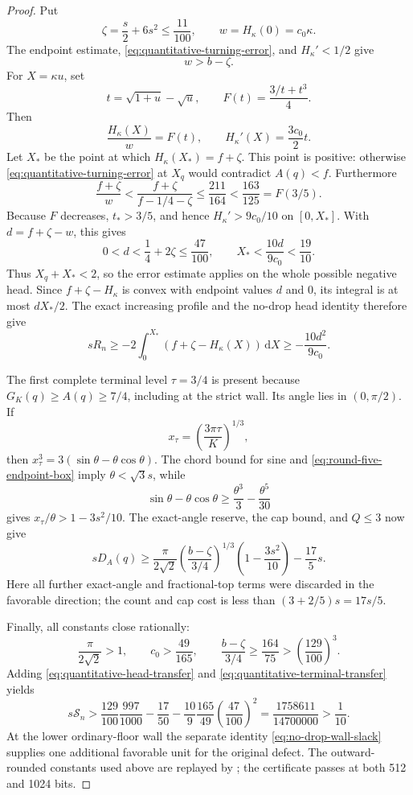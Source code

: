 \documentclass[11pt]{article}
\theoremstyle{remark}
\newcommand{\dd}{\,\mathrm d}
\begin{document}
\begin{proof}
Put
\[
 \zeta=\frac s2+6s^2\leq\frac{11}{100},
 \qquad w=H_\kappa(0)=c_0\kappa.
\]
The endpoint estimate, \eqref{eq:quantitative-turning-error}, and
$H_\kappa'<1/2$ give
\begin{equation}
 w>b-\zeta.
 \label{eq:round-five-w-lower}
\end{equation}
For $X=\kappa u$, set
\[
 t=\sqrt{1+u}-\sqrt u,\qquad
 F(t)=\frac{3/t+t^3}{4}.
\]
Then
\[
 \frac{H_\kappa(X)}w=F(t),
 \qquad H_\kappa'(X)=\frac{3c_0}{2}t.
\]
Let $X_*$ be the point at which $H_\kappa(X_*)=f+\zeta$.  This point is
positive: otherwise \eqref{eq:quantitative-turning-error} at $X_q$ would
contradict $A(q)<f$.  Furthermore
\[
 \frac{f+\zeta}{w}
 <\frac{f+\zeta}{f-1/4-\zeta}
 \leq\frac{211}{164}<\frac{163}{125}=F(3/5).
\]
Because $F$ decreases, $t_*>3/5$, and hence
$H_\kappa'>9c_0/10$ on $[0,X_*]$.  With
$d=f+\zeta-w$, this gives
\[
 0<d<\frac14+2\zeta\leq\frac{47}{100},
 \qquad X_*<\frac{10d}{9c_0}<\frac{19}{10}.
\]
Thus $X_q+X_*<2$, so the error estimate applies on the whole possible
negative head.  Since $f+\zeta-H_\kappa$ is convex with endpoint values
$d$ and $0$, its integral is at most $dX_*/2$.  The exact increasing
profile and the no-drop head identity therefore give
\begin{equation}
 sR_n\geq-2\int_0^{X_*}
 (f+\zeta-H_\kappa(X))\dd X
 \geq-\frac{10d^2}{9c_0}.
 \label{eq:quantitative-head-transfer}
\end{equation}

The first complete terminal level $\tau=3/4$ is present because
$G_K(q)\geq A(q)\geq7/4$, including at the strict wall.  Its angle lies in
$(0,\pi/2)$.  If
\[
 x_\tau=\left(\frac{3\pi\tau}{K}\right)^{1/3},
\]
then $x_\tau^3=3(\sin\theta-\theta\cos\theta)$.  The chord bound for sine
and \eqref{eq:round-five-endpoint-box} imply $\theta<\sqrt3s$, while
\[
 \sin\theta-\theta\cos\theta
 \geq\frac{\theta^3}{3}-\frac{\theta^5}{30}
\]
gives $x_\tau/\theta>1-3s^2/10$.  The exact-angle reserve, the cap bound,
and $Q\leq3$ now give
\begin{equation}
 sD_A(q)\geq
 \frac\pi{2\sqrt2}
 \left(\frac{b-\zeta}{3/4}\right)^{1/3}
 \left(1-\frac{3s^2}{10}\right)-\frac{17}{5}s.
 \label{eq:quantitative-terminal-transfer}
\end{equation}
Here all further exact-angle and fractional-top terms were discarded in
the favorable direction; the count and cap cost is less than
$(3+2/5)s=17s/5$.

Finally, all constants close rationally:
\[
 \frac\pi{2\sqrt2}>1,\qquad c_0>\frac{49}{165},
 \qquad
 \frac{b-\zeta}{3/4}\geq\frac{164}{75}
 >\left(\frac{129}{100}\right)^3.
\]
Adding \eqref{eq:quantitative-head-transfer} and
\eqref{eq:quantitative-terminal-transfer} yields
\[
 s\mathcal S_n>
 \frac{129}{100}\frac{997}{1000}-\frac{17}{50}
 -\frac{10}{9}\frac{165}{49}\left(\frac{47}{100}\right)^2
 =\frac{1758611}{14700000}>\frac1{10}.
\]
At the lower ordinary-floor wall the separate identity
\eqref{eq:no-drop-wall-slack} supplies one additional favorable unit for
the original defect.  The outward-rounded constants used above are replayed
by ; the certificate passes
at both 512 and 1024 bits.
\end{proof}
\end{document}
